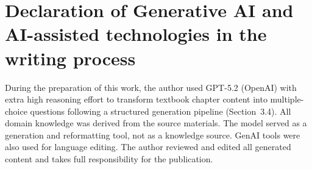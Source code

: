 \documentclass[11pt]{article}
\begin{document}
\section*{Declaration of Generative AI and AI-assisted technologies in the writing process}

During the preparation of this work, the author used GPT-5.2 (OpenAI) with extra high reasoning effort to transform textbook chapter content into multiple-choice questions following a structured generation pipeline (Section~3.4). All domain knowledge was derived from the source materials. The model served as a generation and reformatting tool, not as a knowledge source. GenAI tools were also used for language editing. The author reviewed and edited all generated content and takes full responsibility for the publication.



\end{document}
